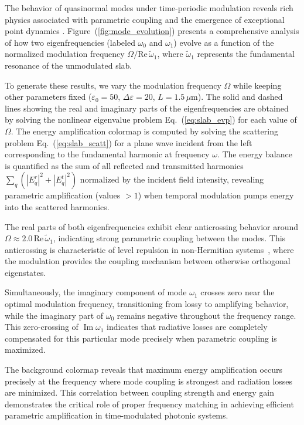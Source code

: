 \documentclass[%
 reprint,
 amsmath,amssymb,
 aps,
 prb,
]{revtex4-2}
\newcommand{\corrections}[1]{#1}
\begin{document}
The behavior of quasinormal modes under time-periodic modulation reveals rich physics associated with parametric coupling and the emergence of exceptional point dynamics \cite{Miri2019}. Figure~(\ref{fig:mode_evolution}) presents a comprehensive analysis of how two eigenfrequencies (labeled $\omega_0$ and $\omega_1$) evolve as a function of the normalized modulation frequency $\Omega/\mathrm{Re}\,\tilde{\omega}_1$, where $\tilde{\omega}_1$ represents the fundamental resonance of the unmodulated slab.

\corrections{To generate these results, we vary the modulation frequency $\Omega$ while keeping other parameters fixed ($\varepsilon_0 = 50$, $\Delta\varepsilon = 20$, $L = 1.5\,\mu$m). The solid and dashed lines showing the real and imaginary parts of the eigenfrequencies are obtained by solving the nonlinear eigenvalue problem Eq.~(\ref{eq:slab_evp}) for each value of $\Omega$. The energy amplification colormap is computed by solving the scattering problem Eq.~(\ref{eq:slab_scatt}) for a plane wave incident from the left corresponding to the fundamental harmonic at frequency $\omega$. The energy balance is quantified as the sum of all reflected and transmitted harmonics $\sum_q (|E_q^r|^2 + |E_q^t|^2)$ normalized by the incident field intensity, revealing parametric amplification (values $> 1$) when temporal modulation pumps energy into the scattered harmonics.}

The real parts of both eigenfrequencies exhibit clear anticrossing behavior around $\Omega \approx 2.0\,\mathrm{Re}\,\tilde{\omega}_1$, indicating strong parametric coupling between the modes. This anticrossing is characteristic of level repulsion in non-Hermitian systems~\cite{Heiss2012}, where the modulation provides the coupling mechanism between otherwise orthogonal eigenstates.

Simultaneously, the imaginary component of mode $\omega_1$ crosses zero near the optimal modulation frequency, transitioning from lossy to amplifying behavior, while the imaginary part of $\omega_0$ remains negative throughout the frequency range. This zero-crossing of $\operatorname{Im}\omega_1$ indicates that radiative losses are completely compensated for this particular mode precisely when parametric coupling is maximized.

The background colormap reveals that maximum energy amplification occurs precisely at the frequency where mode coupling is strongest and radiation losses are minimized. This correlation between coupling strength and energy gain demonstrates the critical role of proper frequency matching in achieving efficient parametric amplification in time-modulated photonic systems.
\end{document}
